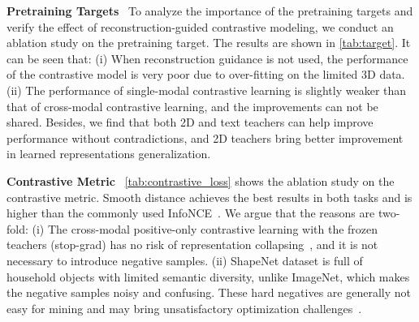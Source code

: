 \documentclass{article}
\theoremstyle{plain}
\theoremstyle{definition}
\theoremstyle{remark}
\begin{document}
\textbf{Pretraining Targets}~
To analyze the importance of the pretraining targets and verify the effect of reconstruction-guided contrastive modeling, we conduct an ablation study on the pretraining target. 
The results are shown in \cref{tab:target}.
It can be seen that: 
(i) When reconstruction guidance is not used, the performance of the contrastive model is very poor due to over-fitting on the limited 3D data.
(ii) The performance of single-modal contrastive learning is slightly weaker than that of cross-modal contrastive learning, and the improvements can not be shared.
Besides, we find that both 2D and text teachers can help improve performance without contradictions, and 2D teachers bring better improvement in learned representations generalization.

\begin{table}[!t]
\caption{\textbf{Ablation study on the contrastive metric}. Overall accuracy (\%) without voting is reported.} \label{tab:contrastive_loss}
\vspace{-5pt}
\begin{center}
\vspace{-18pt}
\end{center}
\end{table}

 \textbf{Contrastive Metric}~
\cref{tab:contrastive_loss} shows the ablation study on the contrastive metric.
Smooth  distance achieves the best results in both tasks and is higher than the commonly used InfoNCE~\citep{InfoNCE}.
We argue that the reasons are two-fold:
(i) The cross-modal positive-only contrastive learning with the frozen teachers (stop-grad) has no risk of representation collapsing~\citep{SimSiam}, and it is not necessary to introduce negative samples.
(ii) ShapeNet dataset is full of household objects with limited semantic diversity, unlike ImageNet, which makes the negative samples noisy and confusing. 
These hard negatives are generally not easy for mining and may bring unsatisfactory optimization challenges~\citep{VSEPP}. 
\end{document}
